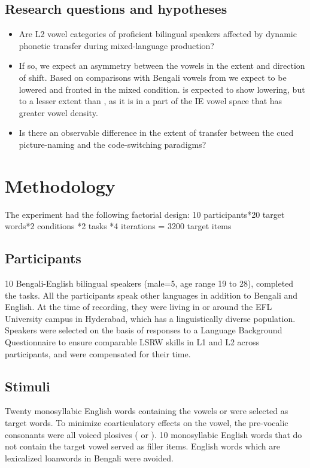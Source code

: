 \documentclass[charis,linguex]{glossa}
\newcommand{\nt}[1]{\textipa{[#1]}} %
\begin{document}
\subsection{Research questions and hypotheses}\label{questions_and_hypotheses}
\begin{itemize}
	\item Are L2 vowel categories of proficient bilingual speakers affected by dynamic phonetic transfer during mixed-language production?
	\item If so, we expect an asymmetry between the vowels in the extent and direction of shift. Based on comparisons with Bengali vowels from \cite{dutta2016using} we expect \nt{2} to be lowered and fronted in the mixed condition. \nt{\ae} is expected to show lowering, but to a lesser extent than \nt{2}, as it is in a part of the IE vowel space that has greater vowel density.
	\item Is there an observable difference in the extent of transfer between the cued picture-naming and the code-switching paradigms? 
\end{itemize}


\section{Methodology} \label{methodology}
The experiment had the following factorial design: 10 participants*20 target words*2 conditions *2 tasks *4 iterations = 3200 target items

\subsection{Participants}

10 Bengali-English bilingual speakers (male=5, age range 19 to 28), completed the tasks. All the participants speak other languages in addition to Bengali and English. At the time of recording, they were living in or around the EFL University campus in Hyderabad, which has a linguistically diverse population. Speakers were selected on the basis of responses to a Language Background Questionnaire to ensure comparable LSRW skills in L1 and L2 across participants, and were compensated for their time.


\subsection{Stimuli}
Twenty monosyllabic English words containing the vowels \nt{2} or \nt{ae} were selected as target words. To minimize coarticulatory effects on the vowel, the pre-vocalic consonants were all voiced plosives (\nt{b} or \nt{d}). 10 monosyllabic English words that do not contain the target vowel served as filler items. English words which are lexicalized loanwords in Bengali were avoided. %
\end{document}
